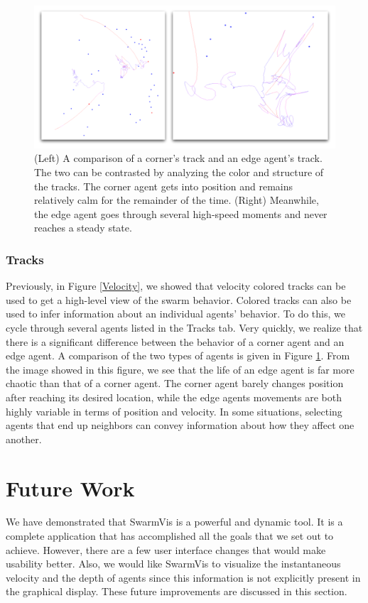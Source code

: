 \documentclass[conference]{IEEEtran}
\begin{document}
\begin{figure}
\centering
\includegraphics[scale=.3]{images/cornervsedge.pdf}
\caption{
(Left) A comparison of a corner's track and an edge agent's track.
The two can be contrasted by analyzing the color and structure of the tracks.
The corner agent gets into position and remains relatively calm for the remainder of the time.
(Right) Meanwhile, the edge agent goes through several high-speed moments and never reaches a steady state.
}
\label{CornerAndEdge}
\end{figure}

\subsubsection{Tracks}
Previously, in Figure \ref{Velocity}, we showed that velocity colored tracks can be used to get a high-level view of the swarm behavior.
Colored tracks can also be used to infer information about an individual agents' behavior.
To do this, we cycle through several agents listed in the Tracks tab.
Very quickly, we realize that there is a significant difference between the behavior of a corner agent and an edge agent.
A comparison of the two types of agents is given in Figure \ref{CornerAndEdge}.
From the image showed in this figure, we see that the life of an edge agent is far more chaotic than that of a corner agent.
The corner agent barely changes position after reaching its desired location,
while the edge agents movements are both highly variable in terms of position and velocity.
In some situations, selecting agents that end up neighbors can convey information about how they affect one another.







\section{Future Work}
We have demonstrated that SwarmVis is a powerful and dynamic tool.
It is a complete application that has accomplished all the goals that we set out to achieve. 
However, there are a few user interface changes that would make usability better.
Also, we would like SwarmVis to visualize the instantaneous velocity and the depth of
agents since this information is not explicitly present in the
graphical display. These future improvements are discussed in this section.
\end{document}
